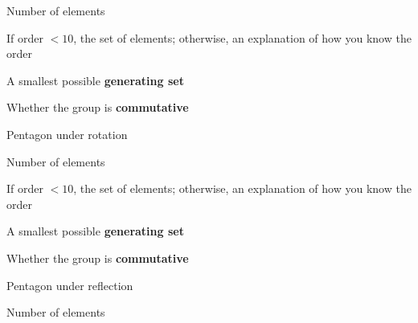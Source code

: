 \documentclass[../gatm_answers.tex]{subfiles}
\begin{document}
\begin{inner_problem}[start=1]
\item Number of elements
\end{inner_problem}

\begin{inner_problem}
\item If order $< 10$, the set of elements; otherwise, an explanation of how you know the order
\end{inner_problem}

\begin{inner_problem}
\item A smallest possible \textbf{generating set}
\end{inner_problem}

\begin{inner_problem}
\item Whether the group is \textbf{commutative}
\end{inner_problem}

\begin{outer_problem}
\item Pentagon under rotation
\end{outer_problem}

\begin{inner_problem}[start=1]
\item Number of elements
\end{inner_problem}

\begin{inner_problem}
\item If order $< 10$, the set of elements; otherwise, an explanation of how you know the order
\end{inner_problem}

\begin{inner_problem}
\item A smallest possible \textbf{generating set}
\end{inner_problem}

\begin{inner_problem}
\item Whether the group is \textbf{commutative}
\end{inner_problem}

\begin{outer_problem}
\item Pentagon under reflection
\end{outer_problem}

\begin{inner_problem}[start=1]
\item Number of elements
\end{inner_problem}
\end{document}
